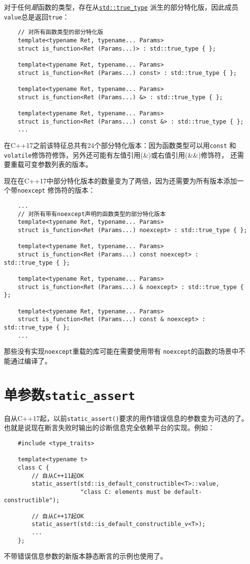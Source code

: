 对于任何\emph{是}函数的类型，存在从\hyperref[ch33.2]{\texttt{std::true\_type}}
派生的部分特化版，因此成员\texttt{value}总是返回\texttt{true}：
\begin{lstlisting}
    // 对所有函数类型的部分特化版
    template<typename Ret, typename... Params>
    struct is_function<Ret (Params...)> : std::true_type { };

    template<typename Ret, typename... Params>
    struct is_function<Ret (Params...) const> : std::true_type { };

    template<typename Ret, typename... Params>
    struct is_function<Ret (Params...) &> : std::true_type { };

    template<typename Ret, typename... Params>
    struct is_function<Ret (Params...) const &> : std::true_type { };
    ...
\end{lstlisting}
在C++17之前该特征总共有24个部分特化版本：因为函数类型可以用\texttt{const}
和\texttt{volatile}修饰符修饰，另外还可能有左值引用(\&)或右值引用(\&\&)修饰符，
还需要重载可变参数列表的版本。

现在在C++17中部分特化版本的数量变为了两倍，因为还需要为所有版本添加一个带\texttt{noexcept}
修饰符的版本：
\begin{lstlisting}
    ...
    // 对所有带有noexcept声明的函数类型的部分特化版本
    template<typename Ret, typename... Params>
    struct is_function<Ret (Params...) noexcept> : std::true_type { };

    template<typename Ret, typename... Params>
    struct is_function<Ret (Params...) const noexcept> : std::true_type { };

    template<typename Ret, typename... Params>
    struct is_function<Ret (Params...) & noexcept> : std::true_type { };

    template<typename Ret, typename... Params>
    struct is_function<Ret (Params...) const & noexcept> : std::true_type { };
    ...
\end{lstlisting}
那些没有实现\texttt{noexcept}重载的库可能在需要使用带有
\texttt{noexcept}的函数的场景中不能通过编译了。

\section{单参数\texttt{static\_assert}}\label{ch8.8}
自从C++17起，以前\texttt{static\_assert()}要求的用作错误信息的参数变为可选的了。
也就是说现在断言失败时输出的诊断信息完全依赖平台的实现。例如：
\begin{lstlisting}
    #include <type_traits>

    template<typename t>
    class C {
        // 自从C++11起OK
        static_assert(std::is_default_constructible<T>::value,
                      "class C: elements must be default-constructible");

        // 自从C++17起OK
        static_assert(std::is_default_constructible_v<T>);
        ...
    };
\end{lstlisting}
不带错误信息参数的新版本静态断言的示例也使用了。

